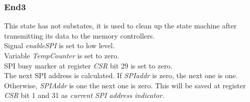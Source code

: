 \subsubsection{End3}
This state has not substates, it is used to clean up the state machine after transmitting its data to the memory controllers. \\
Signal \textit{enableSPI} is set to low level. \\
Variable \textit{TempCounter} is set to zero. \\
SPI busy marker at register \textit{CSR} bit 29 is set to zero.\\ 
The next SPI address is calculated. If \textit{SPIaddr} is zero, the next one is one. Otherwise, \textit{SPIAddr} is one the next one is zero. This will be saved at register \textit{CSR} bit 1 and 31 as \textit{current SPI address indicator}. 














